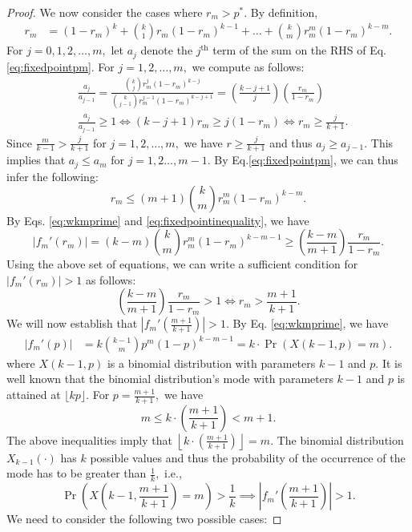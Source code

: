 \documentclass[12pt]{article}
\numberwithin{equation}{section}
\numberwithin{figure}{section}
\theoremstyle{definition}
\theoremstyle{plain}
\theoremstyle{plain}
\theoremstyle{plain}
\theoremstyle{remark}
\theoremstyle{plain}
\theoremstyle{plain}
\begin{document}
\begin{proof}
We now consider the cases where $r_m > p^*$. By definition,
\begin{align}
   r_m &= (1-r_m)^k + \binom{k}{1}r_m(1-r_m)^{k-1} + \dots + \binom{k}{m}r_m^m(1-r_m)^{k-m}\label{eq:fixedpointpm}.
\end{align}
For $j = 0,1,2,\dots,m,$ let $a_j$ denote the $j^{\text{th}}$ term of the sum on the RHS of Eq. \eqref{eq:fixedpointpm}. For $j = 1,2,\dots, m,$ we compute as follows:
\begin{align*}
    &\frac{a_j}{a_{j-1}} = \frac{\binom{k}{j}r_m^j(1-r_m)^{k-j}}{\binom{k}{j-1}r_m^{j-1}(1-r_m)^{k-j+1}}=\left(\frac{k-j+1}{j}\right)\left(\frac{r_m}{1-r_m}\right)\\
    &\frac{a_j}{a_{j-1}}\geq 1 \iff (k-j+1)r_m \geq j(1-r_m) \iff r_m \geq \frac{j}{k+1}.
\end{align*}
Since $\frac{m}{k-1} > \frac{j}{k+1}$ for $j =1,2,\dots, m,$ we have $r \geq \frac{j}{k+1}$ and thus $a_j \geq a_{j-1}$. This implies that $a_j \leq a_m$ for $j=1,2\dots,m-1.$ By Eq.\eqref{eq:fixedpointpm}, we can thus infer the following:
\begin{equation}\label{eq:fixedpointinequality}
    r_m \leq (m+1)\binom{k}{m}r_m^m(1-r_m)^{k-m}.
\end{equation}
By Eqs. \eqref{eq:wkmprime} and \eqref{eq:fixedpointinequality}, we have
\[
|f_m'(r_m)| = (k-m)\binom{k}{m}r_m^m(1-r_m)^{k-m-1} \geq \left(\frac{k-m}{m+1}\right)\frac{r_m}{1-r_m}.
\]
Using the above set of equations, we can write a sufficient condition for $|f_m'(r_m)| > 1$  as follows:
\begin{equation}\label{eq:suffcondmodgeq1}
\left(\frac{k-m}{m+1}\right)\frac{r_m}{1-r_m} > 1 \iff r_m > \frac{m+1}{k+1}.
\end{equation}
We will now establish that $|f_m'\left(\frac{m+1}{k+1} \right)| > 1.$ By Eq. \eqref{eq:wkmprime}, we have
\begin{align*}
    |f_m'(p)| &= k\binom{k-1}{m}p^m(1-p)^{k-m-1} = k\cdot \Pr (X(k-1,p) = m).
\end{align*}
where $X(k-1,p)$ is a binomial distribution with parameters $k-1$ and $p.$ It is well known that the binomial distribution's mode with parameters $k-1$ and $p$ is attained at $\lfloor kp \rfloor.$ For $p = \frac{m+1}{k+1},$ we have 
\[
m \leq  k\cdot \left(\frac{m+1}{k+1}\right)  < m+1.
\]
The above inequalities imply that 
$\left \lfloor k\cdot \left(\frac{m+1}{k+1}\right) \right \rfloor = m.$ The binomial distribution $X_{k-1}(\cdot)$ has $k$ possible values and thus the probability of the occurrence of the mode has to be greater than $\frac{1}{k},$ i.e.,
\[
\Pr\left(X\left(k-1,\frac{m+1}{k+1}\right)= m \right) > \frac{1}{k} \implies \left|f_m'\left(\frac{m+1}{k+1} \right)\right| > 1.
\]
We need to consider the following two possible cases:


\end{proof}
\end{document}
